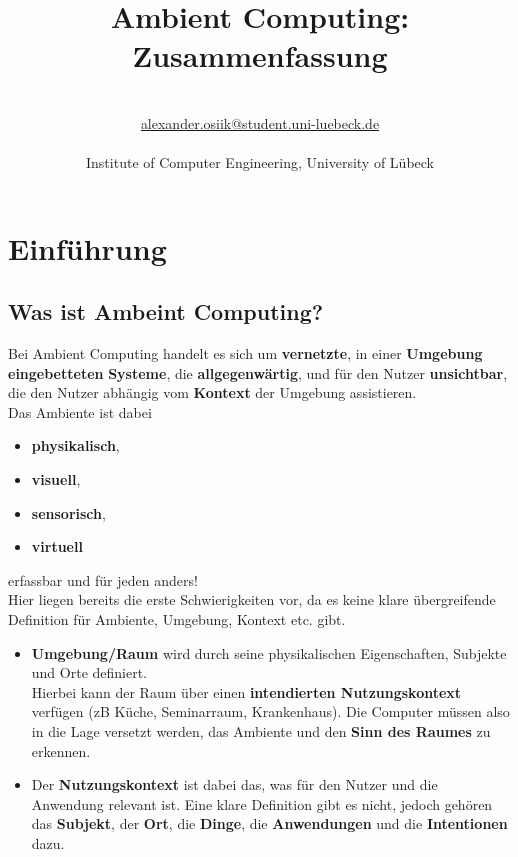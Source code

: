 \documentclass[a4paper]{article}
\title{\textbf{Ambient Computing:\\ Zusammenfassung}}\let\Title\@title
\author{\AuthorName\\
	\href{mailto:alexander.osiik@student.uni-luebeck.de}{alexander.osiik@student.uni-luebeck.de}\\
	\small \seminar\\
	\small Institute of Computer Engineering, University of L\"ubeck\\
}\let\Author\@author
\begin{document}
	\maketitle	
\section{Einführung}
\subsection{Was ist Ambeint Computing?}
Bei Ambient Computing handelt es sich um \textbf{vernetzte}, in einer \textbf{Umgebung} \textbf{eingebetteten} \textbf{Systeme}, die \textbf{allgegenwärtig}, und für den Nutzer \textbf{unsichtbar}, die den Nutzer abhängig vom \textbf{Kontext} der Umgebung assistieren. \\

Das Ambiente ist dabei
\begin{itemize}
	\item \textbf{physikalisch},
	\item \textbf{visuell}, 
	\item \textbf{sensorisch}, 
	\item \textbf{virtuell}
\end{itemize}
erfassbar und für jeden anders!\\

Hier liegen bereits die erste Schwierigkeiten vor, da es keine klare übergreifende Definition für Ambiente, Umgebung, Kontext etc. gibt.
\begin{itemize}
	\item \textbf{Umgebung/Raum} wird durch seine physikalischen Eigenschaften, Subjekte und Orte definiert.\\
	Hierbei kann der Raum über einen \textbf{intendierten Nutzungskontext} verfügen (zB Küche, Seminarraum, Krankenhaus). Die Computer müssen also in die Lage versetzt werden, das Ambiente und den \textbf{Sinn des Raumes} zu erkennen.
	\item Der \textbf{Nutzungskontext} ist dabei das, was für den Nutzer und die Anwendung relevant ist. Eine klare Definition gibt es nicht, jedoch gehören das \textbf{Subjekt}, der \textbf{Ort}, die \textbf{Dinge}, die \textbf{Anwendungen} und die \textbf{Intentionen} dazu.
\end{itemize} 
\end{document}
